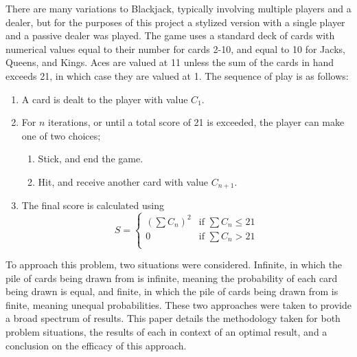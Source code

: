 \smallskip
There are many variations to Blackjack, typically involving multiple players and a dealer, but for the purposes of this project a stylized version with a single player and a passive dealer was played. The game uses a standard deck of cards with numerical values equal to their number for cards 2-10, and equal to 10 for Jacks, Queens, and Kings. Aces are valued at 11 unless the sum of the cards in hand exceeds 21, in which case they are valued at 1. The sequence of play is as follows:
\begin{enumerate}
    \item A card is dealt to the player with value \(C_1\).
    \item For \(n\) iterations, or until a total score of 21 is exceeded, the player can make one of two choices;
    \begin{enumerate} 
        \item Stick, and end the game.
        \item Hit, and receive another card with value \(C_{n+1}\).
    \end{enumerate}
    \item The final score is calculated using
        \begin{equation}
            S= 
            \begin{cases}
                (\sum C_n)^2 & \text{if } \sum C_n \le 21\\
                0            & \text{if } \sum C_n >   21\\
            \end{cases}
        \end{equation}
\end{enumerate}
\smallskip
To approach this problem, two situations were considered. Infinite, in which the pile of cards being drawn from is infinite, meaning the probability of each card being drawn is equal, and finite, in which the pile of cards being drawn from is finite, meaning unequal probabilities. These two approaches were taken to provide a broad spectrum of results. This paper details the methodology taken for both problem situations, the results of each in context of an optimal result, and a conclusion on the efficacy of this approach.